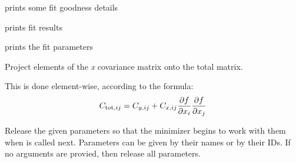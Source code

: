 \documentclass[a4paper,10pt,english]{sphinxmanual}
\begin{document}
\begin{fulllineitems}
\begin{fulllineitems}
\end{fulllineitems}


\begin{fulllineitems}
\label{index:kafe.fit.Fit.print_fit_details}
prints some fit goodness details

\end{fulllineitems}


\begin{fulllineitems}
\label{index:kafe.fit.Fit.print_fit_results}
prints fit results

\end{fulllineitems}


\begin{fulllineitems}
\label{index:kafe.fit.Fit.print_rounded_fit_parameters}
prints the fit parameters

\end{fulllineitems}


\begin{fulllineitems}
\label{index:kafe.fit.Fit.project_x_covariance_matrix}
Project elements of the \emph{x} covariance matrix onto the total
matrix.

This is done element-wise, according to the formula:
\begin{gather}
\begin{split}C_{\text{tot}, ij} = C_{y, ij} + C_{x, ij}
\frac{\partial f}{\partial x_i}  \frac{\partial f}{\partial x_j}\end{split}\notag
\end{gather}
\end{fulllineitems}


\begin{fulllineitems}
\label{index:kafe.fit.Fit.release_parameters}
Release the given parameters so that the minimizer begins to work with
them when  is called next. Parameters can be given by their
names or by their IDs. If no arguments are provied, then release all
parameters.


\end{fulllineitems}
\end{fulllineitems}
\end{document}
